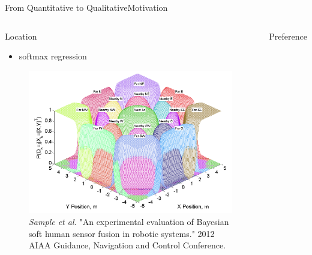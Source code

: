 \begin{frame}{From Quantitative to Qualitative}{Motivation}

\begin{columns}
\begin{block}{ Location }
\begin{minipage}[t][4cm][t]{\textwidth}
\centering

\begin{itemize}
\item softmax regression
\end{itemize}
\begin{figure}
	\centering
	\includegraphics[width=.9\linewidth]{figure/softmax_func}
	\caption{ \tiny{ {\it Sample et al.} "An experimental evaluation of Bayesian soft human sensor fusion in robotic systems."  2012 AIAA Guidance, Navigation and Control Conference.} }
\end{figure}

\end{minipage}
\end{block}	
\begin{block}{ Preference }
\begin{minipage}[t][4cm][t]{\textwidth}
\centering


\end{minipage}
\end{block}
\end{columns}
\end{frame}

